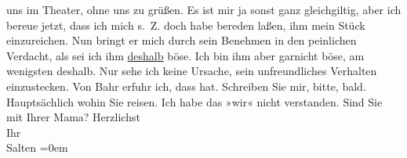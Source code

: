 \begin{ledgroupsized}[t]{13cm}
               uns im Theater, ohne uns zu grüßen. Es ist mir ja sonst ganz gleichgiltig, aber ich
               bereue jetzt, dass ich mich s. Z. doch habe bereden laßen, ihm mein Stück einzureichen. Nun bringt er mich durch sein Benehmen in
               den peinlichen Verdacht, als sei ich ihm \uline{deshalb}
               böse. Ich bin ihm aber garnicht böse, am wenigsten deshalb. Nur sehe ich keine
               Ursache, sein unfreundliches Verhalten einzustecken. \pend
           \pstart
           Von Bahr erfuhr ich, dass \label{K_L03313-1v}\label{K_L03313-1h} hat. Schreiben Sie mir, bitte, bald. Hauptsächlich wohin Sie reisen. Ich habe
               das »wir« nicht verstanden. Sind Sie mit Ihrer Mama? \pend
           \pstart
           Herzlichst {\\[\baselineskip]}Ihr {\\[\baselineskip]}\spacefill\mbox{Salten}\pend
           \leftskip=0em{}
         
         \endnumbering{}\end{ledgroupsized}\begin{anhang}\end{anhang}\newcommand{\dateiname}{L03313}\newcommand{\titel}{Felix Salten an Arthur Schnitzler, 12. 6. 1901}\newcommand{\editorInnen}{Martin Anton Müller und Laura Untner}
      